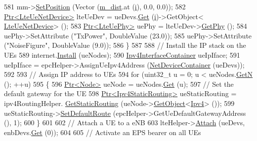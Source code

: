 \begin{DoxyCode}
581       mm->\hyperlink{classns3_1_1MobilityModel_ac584b3d5a309709d2f13ed6ada1e7640}{SetPosition} (Vector (\hyperlink{classLenaFdTbfqFfMacSchedulerTestCase2_ac7e6b74e4a880dfd2874f66d4bf38879}{m\_dist}.at (\hyperlink{bernuolliDistribution_8m_a6f6ccfcf58b31cb6412107d9d5281426}{i}), 0.0, 0.0));
582       \hyperlink{classns3_1_1Ptr}{Ptr<LteUeNetDevice>} lteUeDev = ueDevs.\hyperlink{classns3_1_1NetDeviceContainer_a677d62594b5c9d2dea155cc5045f4d0b}{Get} (\hyperlink{bernuolliDistribution_8m_a6f6ccfcf58b31cb6412107d9d5281426}{i})->GetObject<
      \hyperlink{classns3_1_1LteUeNetDevice}{LteUeNetDevice}> ();
583       \hyperlink{classns3_1_1Ptr}{Ptr<LteUePhy>} uePhy = lteUeDev->\hyperlink{classns3_1_1LteUeNetDevice_a2a9940a1e457a8bf3dae87fed4199c7a}{GetPhy} ();
584       uePhy->SetAttribute (\textcolor{stringliteral}{"TxPower"}, DoubleValue (23.0));
585       uePhy->SetAttribute (\textcolor{stringliteral}{"NoiseFigure"}, DoubleValue (9.0));
586     \}
587 
588   \textcolor{comment}{// Install the IP stack on the UEs}
589   internet.\hyperlink{classns3_1_1InternetStackHelper_a6645b412f31283d2d9bc3d8a95cebbc0}{Install} (ueNodes);
590   \hyperlink{classns3_1_1Ipv4InterfaceContainer}{Ipv4InterfaceContainer} ueIpIface;
591   ueIpIface = epcHelper->AssignUeIpv4Address (\hyperlink{classns3_1_1NetDeviceContainer}{NetDeviceContainer} (ueDevs));
592 
593   \textcolor{comment}{// Assign IP address to UEs}
594   \textcolor{keywordflow}{for} (uint32\_t u = 0; u < ueNodes.\hyperlink{classns3_1_1NodeContainer_aed647ac56d0407a7706aba02eb44b951}{GetN} (); ++u)
595     \{
596       \hyperlink{classns3_1_1Ptr}{Ptr<Node>} ueNode = ueNodes.\hyperlink{classns3_1_1NodeContainer_a9ed96e2ecc22e0f5a3d4842eb9bf90bf}{Get} (u);
597       \textcolor{comment}{// Set the default gateway for the UE}
598       \hyperlink{classns3_1_1Ptr}{Ptr<Ipv4StaticRouting>} ueStaticRouting = ipv4RoutingHelper.
      \hyperlink{classns3_1_1Ipv4StaticRoutingHelper_a731206e50d305695dac7fb2ef963a4bb}{GetStaticRouting} (ueNode->\hyperlink{classns3_1_1Object_a13e18c00017096c8381eb651d5bd0783}{GetObject}<\hyperlink{classns3_1_1Ipv4}{Ipv4}> ());
599       ueStaticRouting->\hyperlink{classns3_1_1Ipv4StaticRouting_aee30fa3246c2b42f122dabdff2725331}{SetDefaultRoute} (epcHelper->GetUeDefaultGatewayAddress (), 1);
600     \}
601 
602   \textcolor{comment}{// Attach a UE to a eNB}
603   lteHelper->\hyperlink{classns3_1_1LteHelper_a9466743f826aa2652a87907b7f0a1c87}{Attach} (ueDevs, enbDevs.\hyperlink{classns3_1_1NetDeviceContainer_a677d62594b5c9d2dea155cc5045f4d0b}{Get} (0));
604 
605   \textcolor{comment}{// Activate an EPS bearer on all UEs}

\end{DoxyCode}
